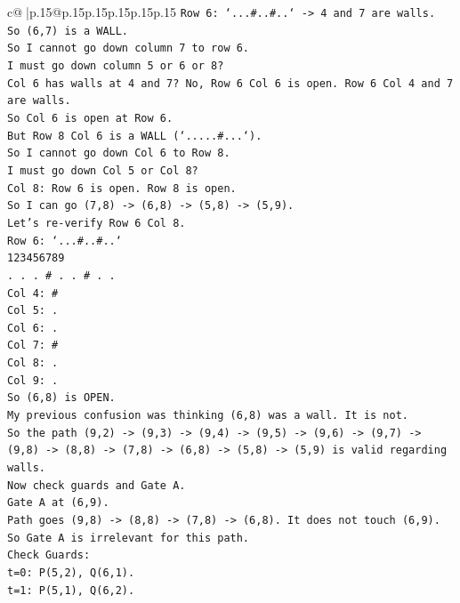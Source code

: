 \documentclass{article}
\begin{document}
{\begin{supertabular}{c@{$\;$}|p{.15\linewidth}@{}p{.15\linewidth}p{.15\linewidth}p{.15\linewidth}p{.15\linewidth}p{.15\linewidth}}
{{{\texttt{Row 6: `...\#..\#..` {-}> 4 and 7 are walls.} \\
\texttt{So (6,7) is a WALL.} \\
\texttt{So I cannot go down column 7 to row 6.} \\
\texttt{I must go down column 5 or 6 or 8?} \\
\texttt{Col 6 has walls at 4 and 7? No, Row 6 Col 6 is open. Row 6 Col 4 and 7 are walls.} \\
\texttt{So Col 6 is open at Row 6.} \\
\texttt{But Row 8 Col 6 is a WALL (`.....\#...`).} \\
\texttt{So I cannot go down Col 6 to Row 8.} \\
\texttt{I must go down Col 5 or Col 8?} \\
\texttt{Col 8: Row 6 is open. Row 8 is open.} \\
\texttt{So I can go (7,8) {-}> (6,8) {-}> (5,8) {-}> (5,9).} \\
\texttt{Let's re{-}verify Row 6 Col 8.} \\
\texttt{Row 6: `...\#..\#..`} \\
\texttt{123456789} \\
\texttt{. . . \# . . \# . .} \\
\texttt{Col 4: \#} \\
\texttt{Col 5: .} \\
\texttt{Col 6: .} \\
\texttt{Col 7: \#} \\
\texttt{Col 8: .} \\
\texttt{Col 9: .} \\
\texttt{So (6,8) is OPEN.} \\
\texttt{My previous confusion was thinking (6,8) was a wall. It is not.} \\
\texttt{So the path (9,2) {-}> (9,3) {-}> (9,4) {-}> (9,5) {-}> (9,6) {-}> (9,7) {-}> (9,8) {-}> (8,8) {-}> (7,8) {-}> (6,8) {-}> (5,8) {-}> (5,9) is valid regarding walls.} \\
\texttt{Now check guards and Gate A.} \\
\texttt{Gate A at (6,9).} \\
\texttt{Path goes (9,8) {-}> (8,8) {-}> (7,8) {-}> (6,8). It does not touch (6,9).} \\
\texttt{So Gate A is irrelevant for this path.} \\
\texttt{Check Guards:} \\
\texttt{t=0: P(5,2), Q(6,1).} \\
\texttt{t=1: P(5,1), Q(6,2).} \\
}}}
\end{supertabular}}
\end{document}
